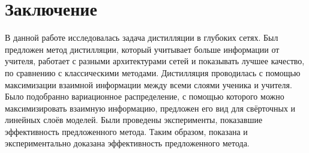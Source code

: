 \section{Заключение}

В данной работе исследовалась задача дистилляции в глубоких сетях.
Был предложен метод дистилляции, который учитывает больше информации от учителя,
работает с разными архитектурами сетей и показывать лучшее качество, по сравнению с классическими методами.
Дистилляция проводилась с помощью максимизации взаимной информации между всеми слоями ученика и учителя.
Было подобранно вариационное распределение, с помощью которого можно максимизировать взаимную информацию,
предложен его вид для свёрточных и линейных слоёв моделей.
Были проведены эксперименты, показавшие эффективность предложенного метода.
Таким образом, показана и экспериментально доказана эффективность предложенного метода.